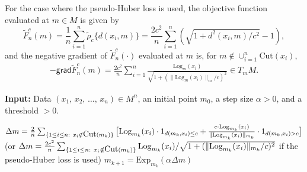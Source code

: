 \documentclass[preprint]{imsart}
\theoremstyle{plain}
\theoremstyle{remark}
\begin{document}
%

For the case where the pseudo-Huber loss is used, the objective function evaluated at $m \in M$ is given by $$\tilde{F}^{c}_{n}(m)= \frac{1}{n}\sum_{i=1}^{n} \tilde{\rho}_{c}\{d(x_i, m)\}= \frac{2c^2}{n}\sum_{i=1}^{n} (\sqrt{1+d^2(x_i, m)/c^2}-1),$$ and the negative gradient of $\tilde{F}^{c}_{n}(\cdot)$ evaluated at $m$ is, for $m \notin \cup_{i=1}^n\mbox{Cut}(x_i)$,
\begin{eqnarray}\label{pseudo_grad}
-\textsf{grad} \tilde{F}^{c}_{n}(m) = \frac{2c^2}{n}\sum_{i=1}^{n}\frac{\mbox{Log}_{m}(x_i)}{\sqrt{1 + (\|\mbox{Log}_{m}(x_i)\|_{m}/c)^2}} \in T_{m}M. 
\end{eqnarray}

\begin{algorithm}[t]
  \caption{Computation for (pseudo) Huber mean for $c \in (0, \infty)$ %
  }
  \label{alg:Huber}
  \begin{algorithmic}
  \State \textbf{Input:}  Data $(x_{1},\, x_{2},\, \ldots,\, x_{n}) \in M^{n}$, an initial point $m_0$, a step size $\alpha > 0$, and a threshold $>0$.

    \State $\Delta m = \frac{2}{n}\sum_{\{1 \le i \le n: ~ x_i \notin \mbox{\tiny Cut}(m_k)\}} \big[\mathrm{\text{Log}}_{m_k}(x_i) \cdot 1_{d(m_{k}, x_i) \le c}
    + \frac{c \cdot \text{Log}_{m_{k}}(x_i)}{\|\text{Log}_{m_{k}}(x_i)\|_{m_k}} \cdot 1_{d(m_{k}, x_i) > c}\big]$  \\
    (or $\Delta m = \frac{2c^2}{n}\sum_{\{1 \le i \le n: ~ x_i \notin \mbox{\tiny Cut}(m_k)\}} \mbox{Log}_{m_{k}}(x_i)/\sqrt{1+(\|\mbox{Log}_{m_{k}}(x_i)\|_{m_k}/c)^2}$ if the pseudo-Huber loss is used)
    \State  $m_{k+1} = \mathrm{\text{Exp}}_{m_{k}}(\alpha \Delta m)$%
    \EndWhile  
  \end{algorithmic}
\end{algorithm}
\end{document}
